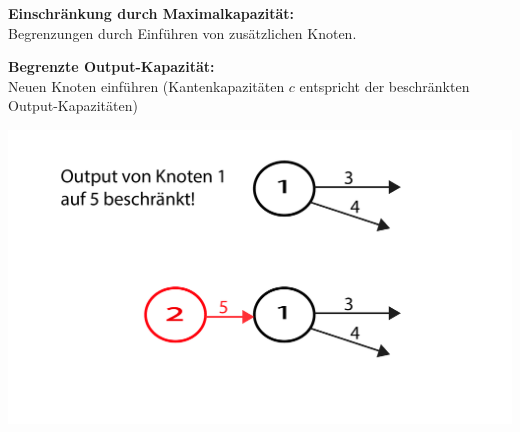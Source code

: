 \textbf{Einschränkung durch Maximalkapazität:}\\
Begrenzungen durch Einführen von zusätzlichen Knoten.

\begin{minipage}{0.6\textwidth}
	\textbf{Begrenzte Output-Kapazität:}\\
	
	Neuen Knoten einführen (Kantenkapazitäten $c$ entspricht der beschränkten Output-Kapazitäten)
\end{minipage}
\begin{minipage}{0.4\textwidth}
	\includegraphics[width=\textwidth]{Content/Graphen/Constrain.pdf}
\end{minipage}

